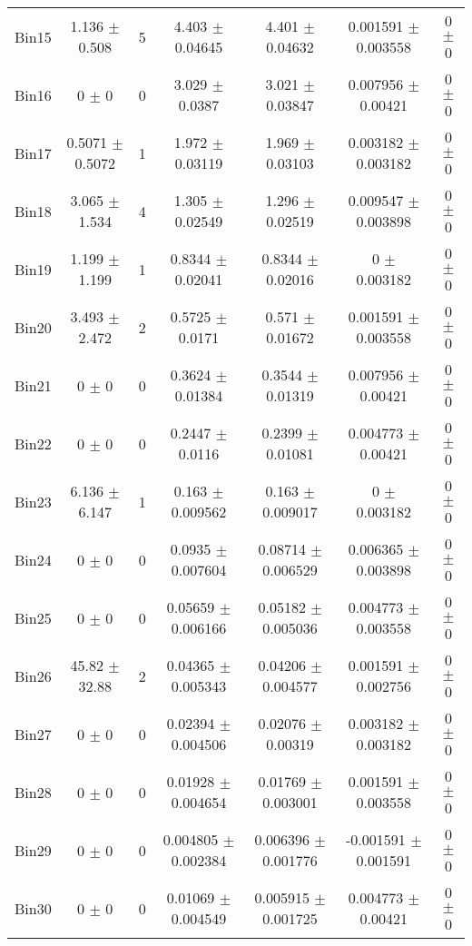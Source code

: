 \begin{tabular}{@{\extracolsep{4pt}}lcccccc@{}}
     Bin15 & 1.136 $\pm$ 0.508 & 5 & 4.403 $\pm$ 0.04645 & 4.401 $\pm$ 0.04632 & 0.001591 $\pm$ 0.003558 & 0 $\pm$ 0 \\ 
     Bin16 & 0 $\pm$ 0 & 0 & 3.029 $\pm$ 0.0387 & 3.021 $\pm$ 0.03847 & 0.007956 $\pm$ 0.00421 & 0 $\pm$ 0 \\ 
     Bin17 & 0.5071 $\pm$ 0.5072 & 1 & 1.972 $\pm$ 0.03119 & 1.969 $\pm$ 0.03103 & 0.003182 $\pm$ 0.003182 & 0 $\pm$ 0 \\ 
     Bin18 & 3.065 $\pm$ 1.534 & 4 & 1.305 $\pm$ 0.02549 & 1.296 $\pm$ 0.02519 & 0.009547 $\pm$ 0.003898 & 0 $\pm$ 0 \\ 
     Bin19 & 1.199 $\pm$ 1.199 & 1 & 0.8344 $\pm$ 0.02041 & 0.8344 $\pm$ 0.02016 & 0 $\pm$ 0.003182 & 0 $\pm$ 0 \\ 
     Bin20 & 3.493 $\pm$ 2.472 & 2 & 0.5725 $\pm$ 0.0171 & 0.571 $\pm$ 0.01672 & 0.001591 $\pm$ 0.003558 & 0 $\pm$ 0 \\ 
     Bin21 & 0 $\pm$ 0 & 0 & 0.3624 $\pm$ 0.01384 & 0.3544 $\pm$ 0.01319 & 0.007956 $\pm$ 0.00421 & 0 $\pm$ 0 \\ 
     Bin22 & 0 $\pm$ 0 & 0 & 0.2447 $\pm$ 0.0116 & 0.2399 $\pm$ 0.01081 & 0.004773 $\pm$ 0.00421 & 0 $\pm$ 0 \\ 
     Bin23 & 6.136 $\pm$ 6.147 & 1 & 0.163 $\pm$ 0.009562 & 0.163 $\pm$ 0.009017 & 0 $\pm$ 0.003182 & 0 $\pm$ 0 \\ 
     Bin24 & 0 $\pm$ 0 & 0 & 0.0935 $\pm$ 0.007604 & 0.08714 $\pm$ 0.006529 & 0.006365 $\pm$ 0.003898 & 0 $\pm$ 0 \\ 
     Bin25 & 0 $\pm$ 0 & 0 & 0.05659 $\pm$ 0.006166 & 0.05182 $\pm$ 0.005036 & 0.004773 $\pm$ 0.003558 & 0 $\pm$ 0 \\ 
     Bin26 & 45.82 $\pm$ 32.88 & 2 & 0.04365 $\pm$ 0.005343 & 0.04206 $\pm$ 0.004577 & 0.001591 $\pm$ 0.002756 & 0 $\pm$ 0 \\ 
     Bin27 & 0 $\pm$ 0 & 0 & 0.02394 $\pm$ 0.004506 & 0.02076 $\pm$ 0.00319 & 0.003182 $\pm$ 0.003182 & 0 $\pm$ 0 \\ 
     Bin28 & 0 $\pm$ 0 & 0 & 0.01928 $\pm$ 0.004654 & 0.01769 $\pm$ 0.003001 & 0.001591 $\pm$ 0.003558 & 0 $\pm$ 0 \\ 
     Bin29 & 0 $\pm$ 0 & 0 & 0.004805 $\pm$ 0.002384 & 0.006396 $\pm$ 0.001776 & -0.001591 $\pm$ 0.001591 & 0 $\pm$ 0 \\ 
     Bin30 & 0 $\pm$ 0 & 0 & 0.01069 $\pm$ 0.004549 & 0.005915 $\pm$ 0.001725 & 0.004773 $\pm$ 0.00421 & 0 $\pm$ 0 \\ 
\hline\hline
  \end{tabular}
